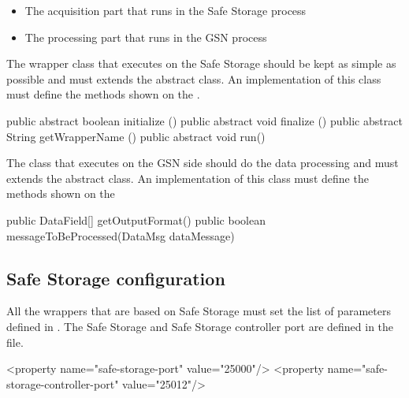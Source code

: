\begin{itemize}
	\item The acquisition part that runs in the Safe Storage process
	\item The processing part that runs in the GSN process
\end{itemize}

The wrapper class that executes on the Safe Storage should be kept as simple as possible and must extends the
 abstract class.
An implementation of this class must define the methods shown on the .

\begin{javacode}[caption={Methods to implement for a Safe Storage Wrapper - Safe Storage Side}, label=listing:java:safestorage_methods_to_implement]
public abstract boolean initialize ()
public abstract void finalize ()
public abstract String getWrapperName () 
public abstract void run()
\end{javacode}

The class that executes on the GSN side should do the data processing and must extends the 
 abstract class.
An implementation of this class must define the methods shown on the 

\begin{javacode}[caption={Methods to implement for a Safe Storage Wrapper - GSN Side}, label=listing:java:safestorage_gsn_methods_to_implement]
public DataField[] getOutputFormat()
public boolean messageToBeProcessed(DataMsg dataMessage)
\end{javacode}

\subsection{Safe Storage configuration}

All the wrappers that are based on Safe Storage must set the list of parameters defined in .
The Safe Storage and Safe Storage controller port are defined in the  file.

\begin{xmlcode}[caption={Safe Storage ports}, label=listing:xml:safestorage_ports]
   <property name="safe-storage-port" value="25000"/>
   <property name="safe-storage-controller-port" value="25012"/>
\end{xmlcode}

